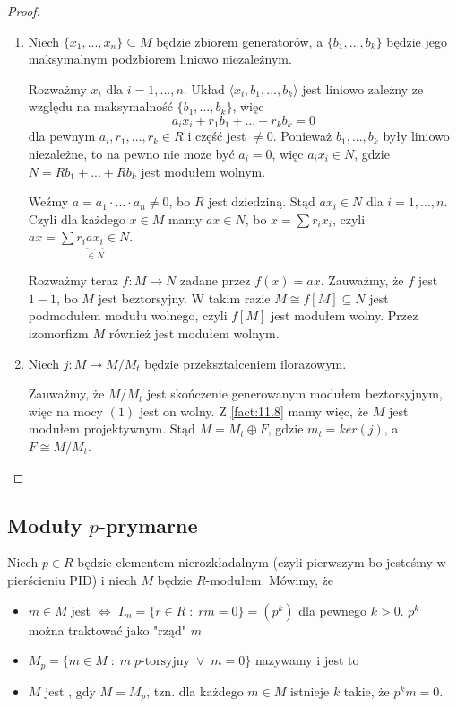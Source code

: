 \begin{proof}
  \begin{enumerate}
    \item Niech $\{x_1,...,x_n\}\subseteq M$ będzie zbiorem generatorów, a $\{b_1,...,b_k\}$ będzie jego maksymalnym podzbiorem liniowo niezależnym.

      Rozważmy $x_i$ dla $i=1,...,n$. Układ $\langle x_i,b_1,...,b_k\rangle$ jest liniowo zależny ze względu na maksymalność $\{b_1,...,b_k\}$, więc
      $$a_ix_i+r_1b_1+...+r_kb_k=0$$
      dla pewnym $a_i,r_1,...,r_k\in R$ i część jest $\neq 0$. Ponieważ $b_1,...,b_k$ były liniowo niezależne, to na pewno nie może być $a_i=0$, więc $a_ix_i\in N$, gdzie $N=Rb_1+...+Rb_k$ jest modułem wolnym.

      Weźmy $a=a_1\cdot...\cdot a_n\neq 0$, bo $R$ jest dziedziną. Stąd $ax_i\in N$ dla $i=1,...,n$. Czyli dla każdego $x\in M$ mamy $ax\in N$, bo $x=\sum r_ix_i$, czyli $ax=\sum r_i\underbrace{ax_i}_{\in N}\in N$.

      Rozważmy teraz $f:M\to N$ zadane przez $f(x)=ax$. Zauważmy, że $f$ jest $1-1$, bo $M$ jest beztorsyjny. W takim razie $M\cong f[M]\subseteq N$ jest podmodułem modułu wolnego, czyli $f[M]$ jest modułem wolny. Przez izomorfizm $M$ również jest modułem wolnym.
  \item Niech $j:M\to M/M_t$ będzie przekształceniem ilorazowym. 

    Zauważmy, że $M/M_t$ jest skończenie generowanym modułem beztorsyjnym, więc na mocy $(1)$ jest on wolny. Z \ref{fact:11.8} mamy więc, że $M$ jest modułem projektywnym. Stąd $M=M_t\oplus F$, gdzie $m_t=ker(j)$, a $F\cong M/M_t$.
  \end{enumerate}
\end{proof}

\subsection{Moduły $p$-prymarne}

\begin{definition}
  Niech $p\in R$ będzie elementem nierozkładalnym (czyli pierwszym bo jesteśmy w pierścieniu PID) i niech $M$ będzie $R$-modułem. Mówimy, że

  \begin{itemize}
    \item $m\in M$ jest  $\iff$ $I_m=\{r\in R\;:\;rm=0\}=(p^k)$ dla pewnego $k>0$. $p^k$ można traktować jako "rząd" $m$
    \item $M_p=\{m\in M\;:\; m\;p\text{-torsyjny}\;\lor\;m=0\}$ nazywamy  i jest to 
    \item $M$ jest , gdy $M=M_p$, tzn. dla każdego $m\in M$ istnieje $k$ takie, że $p^km=0$.
  \end{itemize}
\end{definition}

